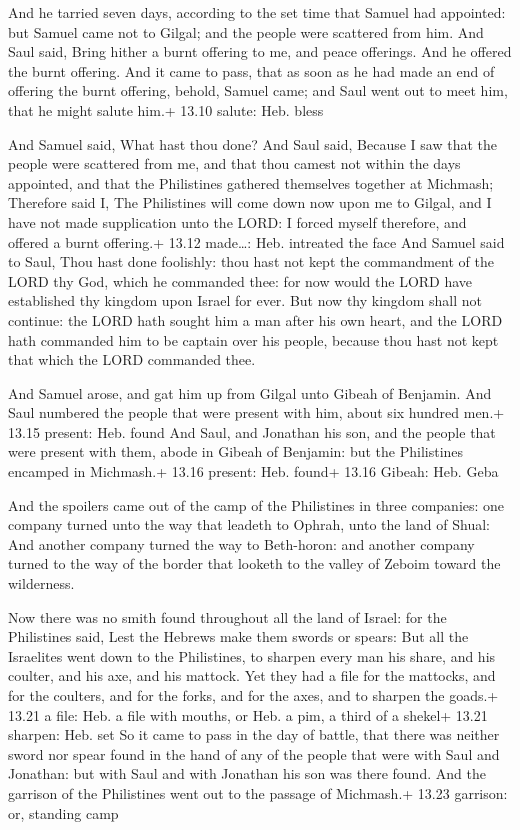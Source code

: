  And he tarried seven days, according to the set time that
Samuel had appointed: but Samuel came not to Gilgal; and the people were
scattered from him.  And Saul said, Bring hither a burnt
offering to me, and peace offerings. And he offered the burnt offering.
 And it came to pass, that as soon as he had made an end of
offering the burnt offering, behold, Samuel came; and Saul went out to
meet him, that he might salute him.+ 13.10 salute: Heb. bless

 And Samuel said, What hast thou done? And Saul said,
Because I saw that the people were scattered from me, and that thou
camest not within the days appointed, and that the Philistines gathered
themselves together at Michmash;  Therefore said I, The
Philistines will come down now upon me to Gilgal, and I have not made
supplication unto the LORD: I forced myself therefore, and offered a
burnt offering.+ 13.12 made\ldots: Heb. intreated the face 
And Samuel said to Saul, Thou hast done foolishly: thou hast not kept
the commandment of the LORD thy God, which he commanded thee: for now
would the LORD have established thy kingdom upon Israel for ever.
 But now thy kingdom shall not continue: the LORD hath
sought him a man after his own heart, and the LORD hath commanded him to
be captain over his people, because thou hast not kept that which the
LORD commanded thee.

 And Samuel arose, and gat him up from Gilgal unto Gibeah
of Benjamin. And Saul numbered the people that were present with him,
about six hundred men.+ 13.15 present: Heb. found  And
Saul, and Jonathan his son, and the people that were present with them,
abode in Gibeah of Benjamin: but the Philistines encamped in Michmash.+
13.16 present: Heb. found+ 13.16 Gibeah: Heb. Geba

 And the spoilers came out of the camp of the Philistines
in three companies: one company turned unto the way that leadeth to
Ophrah, unto the land of Shual:  And another company turned
the way to Beth-horon: and another company turned to the way of the
border that looketh to the valley of Zeboim toward the wilderness.

 Now there was no smith found throughout all the land of
Israel: for the Philistines said, Lest the Hebrews make them swords or
spears:  But all the Israelites went down to the
Philistines, to sharpen every man his share, and his coulter, and his
axe, and his mattock.  Yet they had a file for the
mattocks, and for the coulters, and for the forks, and for the axes, and
to sharpen the goads.+ 13.21 a file: Heb. a file with mouths, or Heb. a
pim, a third of a shekel+ 13.21 sharpen: Heb. set  So it
came to pass in the day of battle, that there was neither sword nor
spear found in the hand of any of the people that were with Saul and
Jonathan: but with Saul and with Jonathan his son was there found.
 And the garrison of the Philistines went out to the
passage of Michmash.+ 13.23 garrison: or, standing camp

